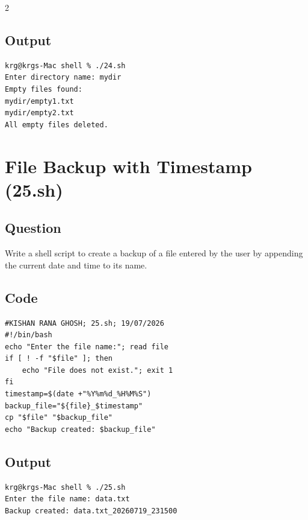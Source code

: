 \documentclass[a4paper,12pt]{article}
\begin{document}
\begin{multicols}{2}
\subsection*{Output}
\begin{lstlisting}[style=outputstyle]
krg@krgs-Mac shell % ./24.sh
Enter directory name: mydir
Empty files found:
mydir/empty1.txt
mydir/empty2.txt
All empty files deleted.
\end{lstlisting}

\end{multicols}

\section{File Backup with Timestamp (25.sh)}
\subsection*{Question}
Write a shell script to create a backup of a file entered by the user by appending the current date and time to its name.

\subsection*{Code}
\begin{lstlisting}[style=bashstyle]
#KISHAN RANA GHOSH; 25.sh; 19/07/2026
#!/bin/bash
echo "Enter the file name:"; read file
if [ ! -f "$file" ]; then
    echo "File does not exist."; exit 1
fi
timestamp=$(date +"%Y%m%d_%H%M%S")
backup_file="${file}_$timestamp"
cp "$file" "$backup_file"
echo "Backup created: $backup_file"
\end{lstlisting}

\subsection*{Output}
\begin{lstlisting}[style=outputstyle]
krg@krgs-Mac shell % ./25.sh
Enter the file name: data.txt
Backup created: data.txt_20260719_231500
\end{lstlisting}
\end{document}
